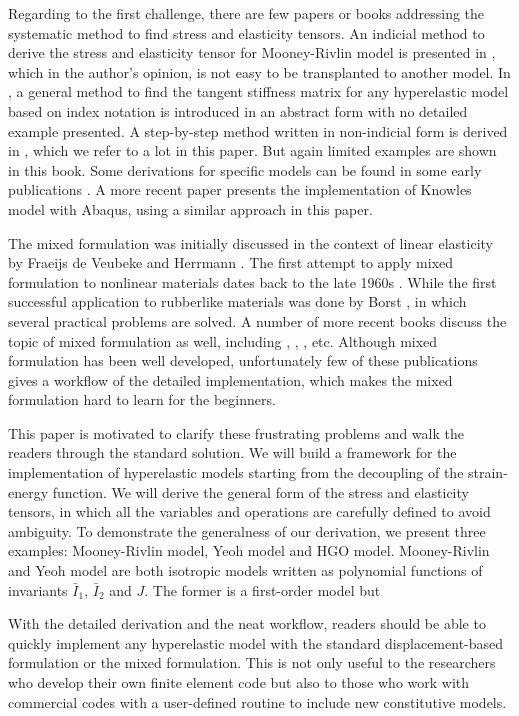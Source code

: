 Regarding to the first challenge, there are few papers or books addressing the systematic method to find stress and elasticity tensors. An indicial method to derive the stress and elasticity tensor for Mooney-Rivlin model is presented in \cite{Bower}, which in the author's opinion, is not easy to be transplanted to another model. In \cite{Belytschko}, a general method to find the tangent stiffness matrix for any hyperelastic model based on index notation is introduced in an abstract form with no detailed example presented. A step-by-step method written in non-indicial form is derived in \cite{Holzapfel}, which we refer to a lot in this paper. But again limited examples are shown in this book. Some derivations for specific models can be found in some early publications \cite{Weiss, Nicholson}. A more recent paper \cite{Suchocki} presents the implementation of Knowles model with Abaqus, using a similar approach in this paper.

The mixed formulation was initially discussed in the context of linear elasticity by Fraeijs de Veubeke \cite{Veubeke} and Herrmann \cite{Herrmann}. The first attempt to apply mixed formulation to nonlinear materials dates back to the late 1960s \cite{Oden}. While the first successful application to rubberlike materials was done by Borst \cite{Borst}, in which several practical problems are solved. A number of more recent books discuss the topic of mixed formulation as well, including \cite{Bathe}, \cite{Holzapfel}, \cite{Zienkiewicz}, etc. Although mixed formulation has been well developed, unfortunately few of these publications gives a workflow of the detailed implementation, which makes the mixed formulation hard to learn for the beginners. 

This paper is motivated to clarify these frustrating problems and walk the readers through the standard solution. We will build a framework for the implementation of hyperelastic models starting from the decoupling of the strain-energy function. We will derive the general form of the stress and elasticity tensors, in which all the variables and operations are carefully defined to avoid ambiguity. To demonstrate the generalness of our derivation, we present three examples: Mooney-Rivlin model, Yeoh model and HGO model. Mooney-Rivlin and Yeoh model are both isotropic models written as polynomial functions of invariants $\bar{I}_1$, $\bar{I}_2$ and $J$. The former is a first-order model but 


With the detailed derivation and the neat workflow, readers should be able to quickly implement any hyperelastic model with the standard displacement-based formulation or the mixed formulation. This is not only useful to the researchers who develop their own finite element code but also to those who work with commercial codes with a user-defined routine to include new constitutive models.

